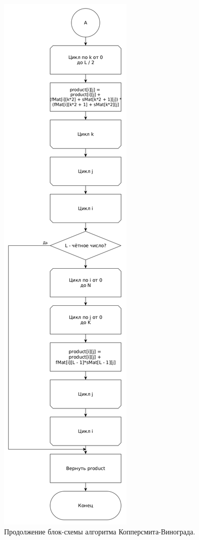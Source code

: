 \documentclass[12pt]{report}
\begin{document}
\begin{figure}
\begin{center}
\includegraphics[scale=0.295]{inc/img/WinogradPart2.png}
\captionsetup{justification=centering}
	\caption{Продолжение блок-схемы алгоритма Копперсмита-Винограда.}
	\label{img:Winograd2}	
\end{center}
\end{figure}
\end{document}

